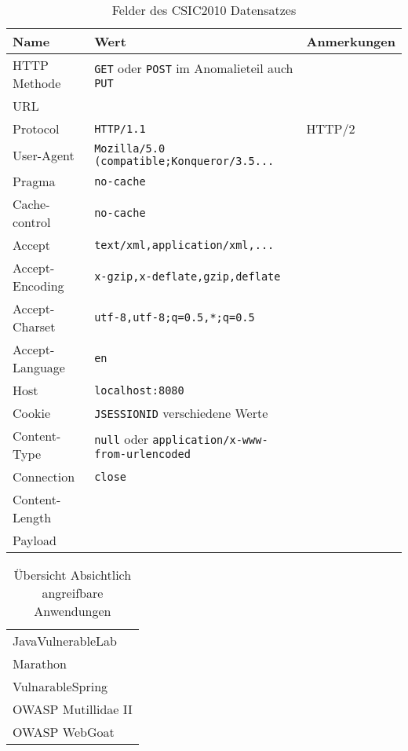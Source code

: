 \begin{table}[h]
  \centering
  \begin{tabular}{|l | l | l |}
    \hline
    \textbf{Name} & \textbf{Wert} & \textbf{Anmerkungen} \\
    \hline
    HTTP Methode & \verb=GET= oder \verb=POST= im Anomalieteil auch \verb=PUT= & \\
    URL & & \\
    Protocol & \verb=HTTP/1.1= & HTTP/2 \\
    User-Agent & \verb=Mozilla/5.0 (compatible;Konqueror/3.5...= & \\
    Pragma & \verb=no-cache= & \\
    Cache-control & \verb=no-cache= & \\
    Accept & \verb=text/xml,application/xml,...= &\\
    Accept-Encoding & \verb=x-gzip,x-deflate,gzip,deflate= & \\
    Accept-Charset & \verb!utf-8,utf-8;q=0.5,*;q=0.5! & \\
    Accept-Language & \verb=en= & \\
    Host & \verb=localhost:8080= & \\
    Cookie & \verb=JSESSIONID= verschiedene Werte & \\
    Content-Type & \verb=null= oder \verb=application/x-www-from-urlencoded= & \\
    Connection & \verb=close= & \\
    Content-Length & & \\
    Payload & & \\
    \hline
    \end{tabular}
  \caption{Felder des CSIC2010 Datensatzes}
  \label{tab:csicfields}
\end{table}

\begin{table}[h]
  \centering
  \begin{tabular}{|l|}
    \hline
    JavaVulnerableLab \\
    Marathon\\
    VulnarableSpring \\
    OWASP Mutillidae II \\
    OWASP WebGoat \\
    \hline
  \end{tabular}
  \caption{Übersicht Absichtlich angreifbare Anwendungen}
  \label{tab:vulnapp}
\end{table}